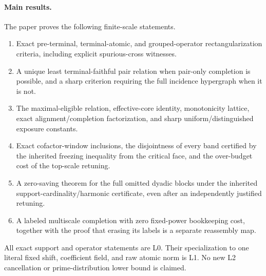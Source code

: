 \paragraph{Main results.}
The paper proves the following finite-scale statements.
\begin{enumerate}[label=\textup{(\roman*)},leftmargin=2.7em]
 \item Exact pre-terminal, terminal-atomic, and grouped-operator
       rectangularization criteria, including explicit spurious-cross
       witnesses.
 \item A unique least terminal-faithful pair relation when pair-only
       completion is possible, and a sharp criterion requiring the full
       incidence hypergraph when it is not.
 \item The maximal-eligible relation, effective-core identity, monotonicity
       lattice, exact alignment/completion factorization, and sharp
       uniform/distinguished exposure constants.
 \item Exact cofactor-window inclusions, the disjointness of every band
       certified by the inherited freezing inequality from the critical
       face, and the over-budget cost of the top-scale retuning.
 \item A zero-saving theorem for the full omitted dyadic blocks under the
       inherited support-cardinality/harmonic certificate, even after an
       independently justified retuning.
 \item A labeled multiscale completion with zero fixed-power bookkeeping
       cost, together with the proof that erasing its labels is a separate
       reassembly map.
\end{enumerate}

All exact support and operator statements are L0.  Their specialization to
one literal fixed shift, coefficient field, and raw atomic norm is L1.  No
new L2 cancellation or prime-distribution lower bound is claimed.

